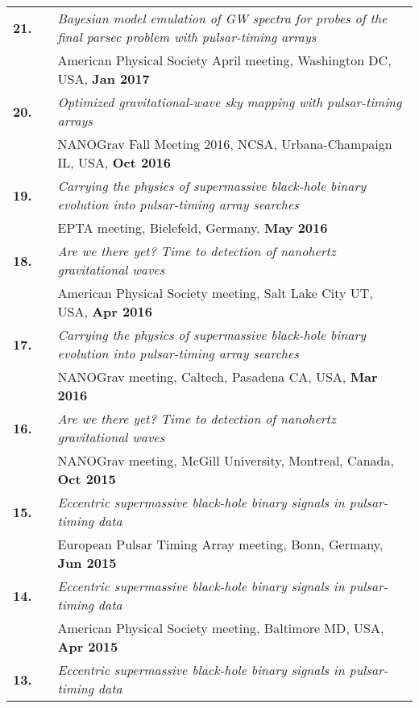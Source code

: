 \documentclass[11pt,letterpaper,sans]{moderncv}
\begin{document}
{\begin{longtable}{rp{0.3cm}p{15.8cm}}
\textbf{21.} & & \textit{Bayesian model emulation of GW spectra for probes of the final parsec problem with pulsar-timing arrays} \\ 
&& American Physical Society April meeting, Washington DC, USA, \textbf{Jan 2017} \vspace{0.09cm}\\
\textbf{20.} & & \textit{Optimized gravitational-wave sky mapping with pulsar-timing arrays} \\ 
&& NANOGrav Fall Meeting 2016, NCSA, Urbana-Champaign IL, USA, \textbf{Oct 2016} \vspace{0.09cm}\\
\textbf{19.} & & \textit{Carrying the physics of supermassive black-hole binary evolution into pulsar-timing array searches} \\ 
&& EPTA meeting, Bielefeld, Germany, \textbf{May 2016} \vspace{0.09cm}\\
\textbf{18.} & & \textit{Are we there yet? Time to detection of nanohertz gravitational waves} \\ 
&& American Physical Society meeting, Salt Lake City UT, USA, \textbf{Apr 2016} \vspace{0.09cm}\\
\textbf{17.} & & \textit{Carrying the physics of supermassive black-hole binary evolution into pulsar-timing array searches} \\ 
&& NANOGrav meeting, Caltech, Pasadena CA, USA, \textbf{Mar 2016} \vspace{0.09cm}\\
\textbf{16.} & & \textit{Are we there yet? Time to detection of nanohertz gravitational waves} \\ 
&& NANOGrav meeting, McGill University, Montreal, Canada, \textbf{Oct 2015} \vspace{0.09cm}\\
\textbf{15.} & & \textit{Eccentric supermassive black-hole binary signals in pulsar-timing data} \\ 
&& European Pulsar Timing Array meeting, Bonn, Germany, \textbf{Jun 2015} \vspace{0.09cm}\\
\textbf{14.} & & \textit{Eccentric supermassive black-hole binary signals in pulsar-timing data} \\ 
&& American Physical Society meeting, Baltimore MD, USA, \textbf{Apr 2015} \vspace{0.09cm}\\
\textbf{13.} & & \textit{Eccentric supermassive black-hole binary signals in pulsar-timing data} \\ 

\end{longtable}}
\end{document}
